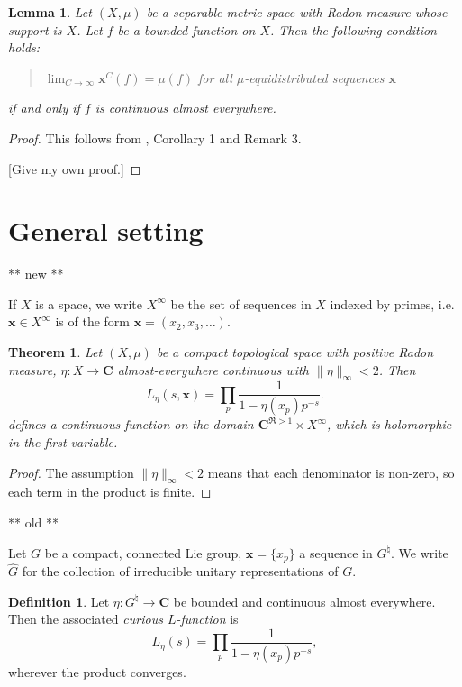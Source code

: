 \documentclass{article}
\newcommand{\bC}{\mathbf{C}}
\newcommand{\bx}{\boldsymbol{x}}
\newtheorem{theorem}[subsection]{Theorem}
\newtheorem{lemma}[subsection]{Lemma}
\theoremstyle{definition}
\newtheorem{definition}[subsection]{Definition}
\begin{document}
\begin{lemma}\label{debruijn-post}
Let $(X,\mu)$ be a separable metric space with Radon measure whose support is 
$X$. Let $f$ be a bounded function on $X$. Then the following condition holds:
\begin{quote}
$\lim_{C\to \infty} \bx^C(f) = \mu(f)$ for all $\mu$-equidistributed sequences $\bx$
\end{quote}
if and only if $f$ is continuous almost everywhere.
\end{lemma}
\begin{proof}
This follows from \cite{chersi-volcic-1992}, Corollary 1 and Remark 3. 

[Give my own proof.]
\end{proof}





\section{General setting}

** new **

If $X$ is a space, we write $X^\infty$ be the set of sequences 
in $X$ indexed by primes, i.e. $\bx\in X^\infty$ is of the form 
$\bx=(x_2,x_3,\dots)$. 

\begin{theorem}
Let $(X,\mu)$ be a compact topological space with positive Radon measure, 
$\eta\colon X\to \bC$ almost-everywhere continuous with $\|\eta\|_\infty<2$. 
Then 
\begin{equation}\label{def:curious-L}
	L_\eta(s,\bx) = \prod_p \frac{1}{1-\eta(x_p) p^{-s}} .
\end{equation}
defines a continuous function on the domain 
$\bC^{\Re>1}\times X^\infty$, which is holomorphic in the first variable. 
\end{theorem}
\begin{proof}
The assumption $\|\eta\|_\infty<2$ means that each denominator is non-zero, so 
each term in the product is finite. 
\end{proof}

** old **

Let $G$ be a compact, connected Lie group, $\bx=\{x_p\}$ a sequence in 
$G^\natural$. We write $\widehat G$ for the collection of irreducible unitary 
representations of $G$. 

\begin{definition}
Let $\eta\colon G^\natural \to \bC$ be bounded and continuous almost 
everywhere. Then the associated \emph{curious $L$-function} is 
\[
	L_\eta(s) = \prod_p \frac{1}{1-\eta(x_p) p^{-s}} ,
\]
wherever the product converges. 
\end{definition}
\end{document}
